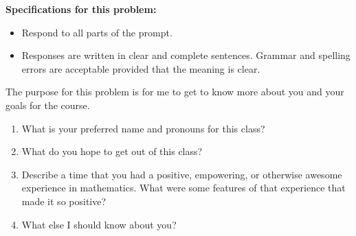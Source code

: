 \documentclass[11pt]{article}
\begin{document}

\newpage

{\bf Specifications for this problem:}
\begin{itemize}
    \item Respond to all parts of the prompt.
    \item Responses are written in clear and complete sentences. Grammar and spelling errors are acceptable provided that the meaning is clear.
\end{itemize}

\begin{tcolorbox}[title = 5. About You]
The purpose for this problem is for me to get to know more about you and your goals for the course.

\begin{enumerate}
    \item What is your preferred name and pronouns for this class?
    \item What do you hope to get out of this class?
    \item Describe a time that you had a positive, empowering, or otherwise awesome experience in mathematics. What were some features of that experience that made it so positive?
    \item What else I should know about you?
\end{enumerate}
\end{tcolorbox}



\newpage

\end{document}
